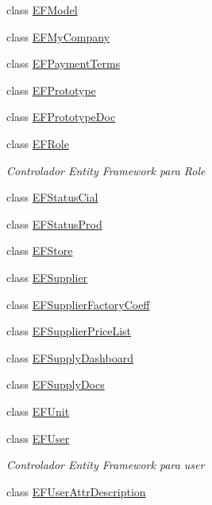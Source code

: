 \begin{DoxyCompactItemize}
\item 
class \mbox{\hyperlink{class_h_k_supply_1_1_services_1_1_implementations_1_1_e_f_model}{E\+F\+Model}}
\item 
class \mbox{\hyperlink{class_h_k_supply_1_1_services_1_1_implementations_1_1_e_f_my_company}{E\+F\+My\+Company}}
\item 
class \mbox{\hyperlink{class_h_k_supply_1_1_services_1_1_implementations_1_1_e_f_payment_terms}{E\+F\+Payment\+Terms}}
\item 
class \mbox{\hyperlink{class_h_k_supply_1_1_services_1_1_implementations_1_1_e_f_prototype}{E\+F\+Prototype}}
\item 
class \mbox{\hyperlink{class_h_k_supply_1_1_services_1_1_implementations_1_1_e_f_prototype_doc}{E\+F\+Prototype\+Doc}}
\item 
class \mbox{\hyperlink{class_h_k_supply_1_1_services_1_1_implementations_1_1_e_f_role}{E\+F\+Role}}
\begin{DoxyCompactList}\small\item\em Controlador Entity Framework para Role \end{DoxyCompactList}\item 
class \mbox{\hyperlink{class_h_k_supply_1_1_services_1_1_implementations_1_1_e_f_status_cial}{E\+F\+Status\+Cial}}
\item 
class \mbox{\hyperlink{class_h_k_supply_1_1_services_1_1_implementations_1_1_e_f_status_prod}{E\+F\+Status\+Prod}}
\item 
class \mbox{\hyperlink{class_h_k_supply_1_1_services_1_1_implementations_1_1_e_f_store}{E\+F\+Store}}
\item 
class \mbox{\hyperlink{class_h_k_supply_1_1_services_1_1_implementations_1_1_e_f_supplier}{E\+F\+Supplier}}
\item 
class \mbox{\hyperlink{class_h_k_supply_1_1_services_1_1_implementations_1_1_e_f_supplier_factory_coeff}{E\+F\+Supplier\+Factory\+Coeff}}
\item 
class \mbox{\hyperlink{class_h_k_supply_1_1_services_1_1_implementations_1_1_e_f_supplier_price_list}{E\+F\+Supplier\+Price\+List}}
\item 
class \mbox{\hyperlink{class_h_k_supply_1_1_services_1_1_implementations_1_1_e_f_supply_dashboard}{E\+F\+Supply\+Dashboard}}
\item 
class \mbox{\hyperlink{class_h_k_supply_1_1_services_1_1_implementations_1_1_e_f_supply_docs}{E\+F\+Supply\+Docs}}
\item 
class \mbox{\hyperlink{class_h_k_supply_1_1_services_1_1_implementations_1_1_e_f_unit}{E\+F\+Unit}}
\item 
class \mbox{\hyperlink{class_h_k_supply_1_1_services_1_1_implementations_1_1_e_f_user}{E\+F\+User}}
\begin{DoxyCompactList}\small\item\em Controlador Entity Framework para user \end{DoxyCompactList}\item 
class \mbox{\hyperlink{class_h_k_supply_1_1_services_1_1_implementations_1_1_e_f_user_attr_description}{E\+F\+User\+Attr\+Description}}
\end{DoxyCompactItemize}
